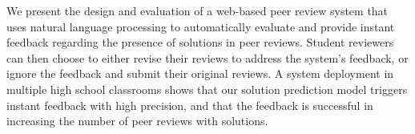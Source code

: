 We present the design and evaluation of a web-based peer review system that uses natural language processing to automatically evaluate and provide instant feedback regarding the presence of solutions in peer reviews. Student reviewers can then choose to either revise their reviews to address the system's feedback, or ignore the feedback and submit their original reviews. A system deployment in multiple high school classrooms shows that our solution prediction model triggers instant feedback with high precision, and that the feedback is successful in increasing the number of peer reviews with solutions.
